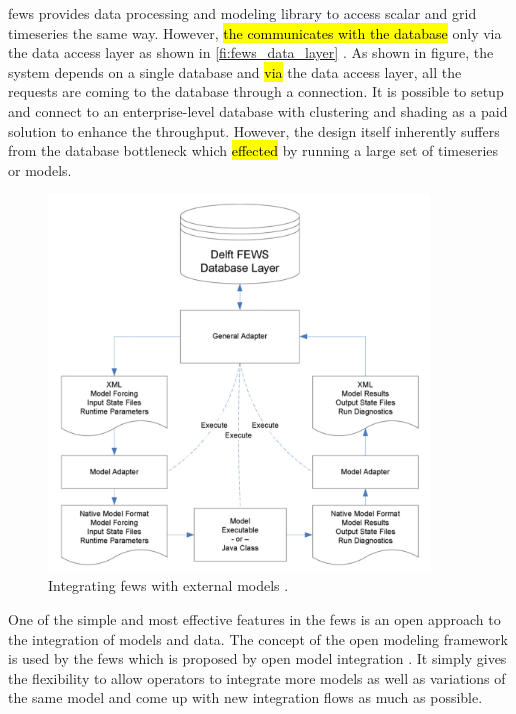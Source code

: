 \acrshort{fews} provides data processing and modeling library to access scalar and grid timeseries the same way. However, \hl{the communicates with the database} only via the data access layer as shown in \cref{fi:fews_data_layer} \cite{Werner2013TheSystem}. As %
shown in figure, the system depends on a single database and \hl{via} the data access layer, all the requests are coming to the database through a connection. It is possible to setup and connect to an enterprise-level database with clustering and shading as a paid solution to enhance the throughput. %
However, the design itself inherently suffers from the database bottleneck which \hl{effected} by running a large set of timeseries or models.

\begin{figure}[htp]
    \centering
    \includegraphics[width=0.9\textwidth]{lit/fews/Linking-Delft-FEWS-with-external-models-The-fi-gure-shows-the-fl-ow-of-data-through-XML_W640.png}
    \caption[\acrshort{fews} integration with external models]{Integrating \acrshort{fews} with external models \cite{Werner2013TheSystem}.}
    \label{fi:fews_general_adapter}
\end{figure}
One of the simple and most effective features in the \acrshort{fews} is an open approach to the integration of models and data. The concept of the open modeling framework is used by the \acrshort{fews} which is proposed by open model integration \cite{Kokkonen2003InterfacingXML}. It simply gives the flexibility to allow operators to integrate more models as well as variations of the same model and come up with new integration flows as much as possible.
